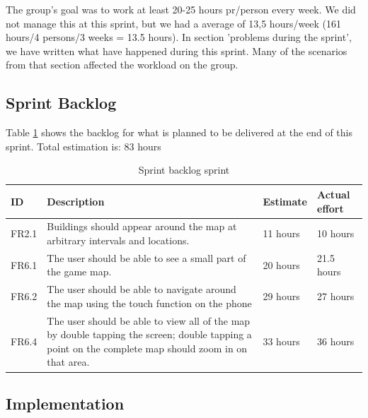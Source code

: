 	The group's goal was to work at least 20-25 hours pr/person every week. We did not manage this at this sprint, but we had a average of 13,5 hours/week (161 hours/4 persons/3 weeks = 13.5 hours). 
	In section 'problems during the sprint', we have written what have happened during this sprint.
	Many of the scenarios from that section affected the workload on the group. 

\subsection{Sprint Backlog}

	Table \ref{table:backlogsprint1} shows the backlog for what is planned to be delivered at the end of this sprint.
	Total estimation is: 83 hours

\begin{table}[H]
\begin{tabular}{| p{1cm} | p{7cm} | p{2cm} | p{2cm} |}
	\hline
	\rowcolor{gray}
	ID & Description & Estimate & Actual effort \\ \hline
	FR2.1 & Buildings should appear around the map at arbitrary intervals and locations. 
	& 11 hours & 10 hours \\ \hline
	FR6.1 & The user should be able to see a small part of the game map. 
	& 20 hours & 21.5 hours \\ \hline
	FR6.2 & The user should be able to navigate around the map using the touch function on the phone 
	& 29 hours & 27 hours \\ \hline
	FR6.4 & The user should be able to view all of the map by double tapping the screen; double tapping a point on the complete map should zoom in on that area. 
	& 33 hours & 36 hours \\ \hline
\end{tabular}
\caption{Sprint backlog sprint}
\label{table:backlogsprint1}
\end{table}

\subsection{Implementation}


